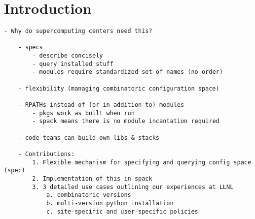 
\section{Introduction}
\label{sec:intro}


\begin{verbatim}
- Why do supercomputing centers need this?

	- specs
		- describe concisely
		- query installed stuff
		- modules require standardized set of names (no order)

	- flexibility (managing combinatoric configuration space)

	- RPATHs instead of (or in addition to) modules
		- pkgs work as built when run
		- spack means there is no module incantation required

	- code teams can build own libs & stacks

	- Contributions:
		1. Flexible mechanism for specifying and querying config space (spec)
		2. Implementation of this in spack
		3. 3 detailed use cases outlining our experiences at LLNL
			a. combinatoric versions
			b. multi-version python installation
			c. site-specific and user-specific policies
\end{verbatim}

